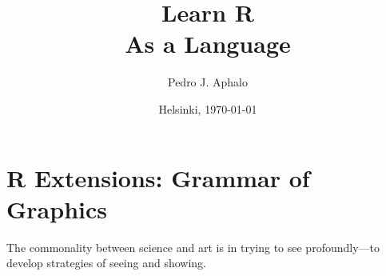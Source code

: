 \documentclass[krantz2]{krantz}\usepackage{knitr}
\begin{document}

\title{\Huge{\sffamily Learn R\\{\Large As a Language}}}

\author{Pedro J. Aphalo}

\date{Helsinki, \today}


















\frontmatter

\maketitle

\newpage

\setcounter{page}{5} %
\tableofcontents
\listoffigures
\listoftables



%



\mainmatter





















\chapter{R Extensions: Grammar of Graphics}\label{chap:R:plotting}

\begin{VF}
The commonality between science and art is in trying to see profoundly---to develop strategies of seeing and showing.

\nocite{Zachry2004}
\end{VF}
\end{document}
